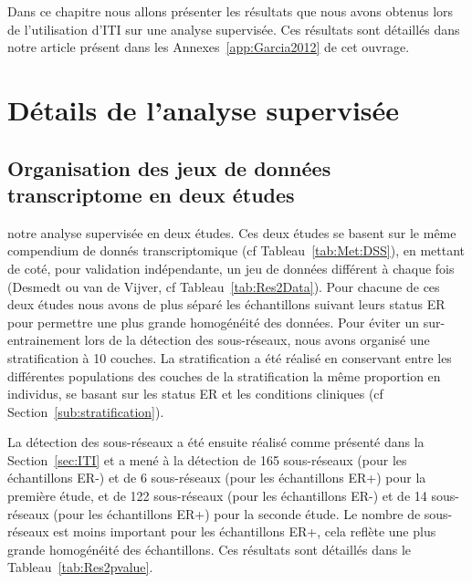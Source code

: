 \singlespacing

\label{chap:results2}
		\begin{center}
			\begin{tcolorbox}[colback=green!5!white,colframe=green!45!black,arc=0mm]
				\sffamily
				Dans ce chapitre nous allons présenter les résultats que nous avons obtenus lors de l'utilisation d'ITI sur une analyse supervisée.
				Ces résultats sont détaillés dans notre article\citet{Garcia2012} présent dans les Annexes~\ref{app:Garcia2012} de cet ouvrage.
			\end{tcolorbox}
			\vspace{5ex}
			\minitoc
		\end{center}
		\newpage

\doublespacing

	\section{\textcolor{green!45!black}{Détails de l'analyse supervisée}}
		\subsection{\textcolor{green!45!black}{Organisation des jeux de données transcriptome en deux études}}
		 notre analyse supervisée en deux études.
		Ces deux études se basent sur le même compendium de donnés transcriptomique (cf Tableau~\ref{tab:Met:DSS}), en mettant de coté, pour validation indépendante, un jeu de données différent à chaque fois (Desmedt ou van de Vijver, cf Tableau~\ref{tab:Res2Data}).
		Pour chacune de ces deux études nous avons de plus séparé les échantillons suivant leurs status \acs{ER} pour permettre une plus grande homogénéité des données.
		Pour éviter un sur-entrainement lors de la détection des sous-réseaux, nous avons organisé une stratification à 10 couches.
		La stratification a été réalisé en conservant entre les différentes populations des couches de la stratification la même proportion en individus, se basant sur les status \acs{ER} et les conditions cliniques (cf Section~\ref{sub:stratification}).

		La détection des sous-réseaux a été ensuite réalisé comme présenté dans la Section~\ref{sec:ITI} et a mené à la détection de 165 sous-réseaux (pour les échantillons ER-) et de 6 sous-réseaux (pour les échantillons ER+) pour la première étude, et de 122 sous-réseaux (pour les échantillons ER-) et de 14 sous-réseaux (pour les échantillons ER+) pour la seconde étude.
		Le nombre de sous-réseaux est moins important pour les échantillons ER+, cela reflète une plus grande homogénéité des échantillons.
		Ces résultats sont détaillés dans le Tableau~\ref{tab:Res2pvalue}.

